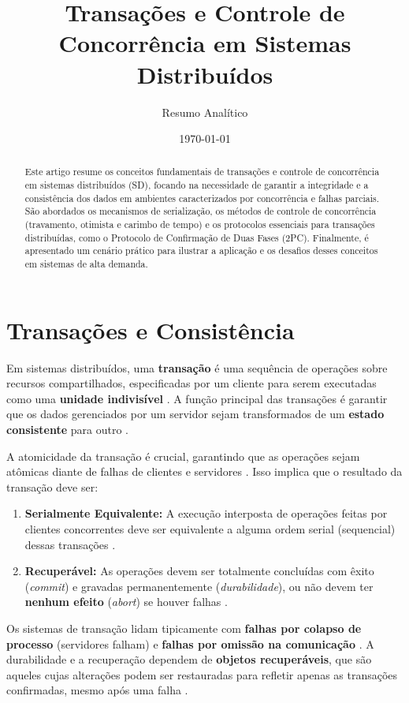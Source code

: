 \documentclass[12pt, a4paper]{article}
\title{Transações e Controle de Concorrência em Sistemas Distribuídos}
\author{Resumo Analítico}
\date{\today}
\begin{document}
\maketitle

\begin{abstract}
Este artigo resume os conceitos fundamentais de transações e controle de concorrência em sistemas distribuídos (SD), focando na necessidade de garantir a integridade e a consistência dos dados em ambientes caracterizados por concorrência e falhas parciais. São abordados os mecanismos de serialização, os métodos de controle de concorrência (travamento, otimista e carimbo de tempo) e os protocolos essenciais para transações distribuídas, como o Protocolo de Confirmação de Duas Fases (2PC). Finalmente, é apresentado um cenário prático para ilustrar a aplicação e os desafios desses conceitos em sistemas de alta demanda.
\end{abstract}

\section{Transações e Consistência}

Em sistemas distribuídos, uma \textbf{transação} é uma sequência de operações sobre recursos compartilhados, especificadas por um cliente para serem executadas como uma \textbf{unidade indivisível} \cite{604, 605, 615}. A função principal das transações é garantir que os dados gerenciados por um servidor sejam transformados de um \textbf{estado consistente} para outro \cite{603}.

A atomicidade da transação é crucial, garantindo que as operações sejam atômicas diante de falhas de clientes e servidores \cite{615}. Isso implica que o resultado da transação deve ser:
\begin{enumerate}
    \item \textbf{Serialmente Equivalente:} A execução interposta de operações feitas por clientes concorrentes deve ser equivalente a alguma ordem serial (sequencial) dessas transações \cite{431, 605, 602, 615}.
    \item \textbf{Recuperável:} As operações devem ser totalmente concluídas com êxito (\textit{commit}) e gravadas permanentemente (\textit{durabilidade}), ou não devem ter \textbf{nenhum efeito} (\textit{abort}) se houver falhas \cite{605}.
\end{enumerate}

Os sistemas de transação lidam tipicamente com \textbf{falhas por colapso de processo} (servidores falham) e \textbf{falhas por omissão na comunicação} \cite{604, 387}. A durabilidade e a recuperação dependem de \textbf{objetos recuperáveis}, que são aqueles cujas alterações podem ser restauradas para refletir apenas as transações confirmadas, mesmo após uma falha \cite{388, 389}.
\end{document}
